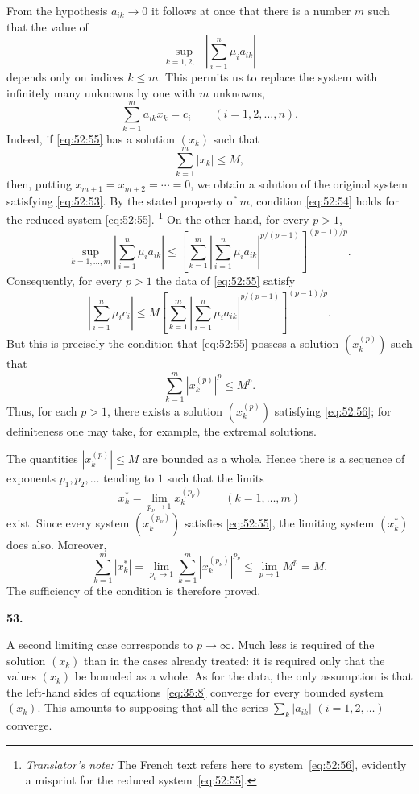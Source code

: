\documentclass[
  paper=b5,
  fontsize=13pt,
  twoside=true,
  open=any,
  bookmarkpackage=false,
  chapterprefix=true,
  headings=normal
]{scrbook}
\theoremstyle{definition}
\newcommand{\numberedparagraph}[1]{%
  \par\medskip\phantomsection\label{sec:#1}%
  \noindent\textbf{#1.}\enspace
}
\newcounter{translatornote}
\newcommand{\translatornotelabel}{T\arabic{translatornote}}
\newcommand{\translatornote}[1]{%
  \stepcounter{translatornote}%
  \begingroup
    \edef\savedfootnotenumber{\number\value{footnote}}%
    \renewcommand{\thefootnote}{\translatornotelabel}%
    \footnote{\emph{Translator's note:} #1}%
    \setcounter{footnote}{\savedfootnotenumber}%
  \endgroup
}
\begin{document}
From the hypothesis $a_{ik}\to0$ it follows at once that there is a number
$m$ such that the value of
\[
  \operatorname*{sup}_{k=1,2,\ldots}
    \left|\sum_{i=1}^{n}\mu_i a_{ik}\right|
\]
depends only on indices $k\leq m$. This permits us to replace the system
with infinitely many unknowns by one with $m$ unknowns,
\begin{equation}
  \sum_{k=1}^{m}a_{ik}x_k=c_i\qquad(i=1,2,\ldots,n).
  \tag{55}\label{eq:52:55}
\end{equation}
Indeed, if \eqref{eq:52:55} has a solution $(x_k)$ such that
\[
  \sum_{k=1}^{m}|x_k|\leq M,
\]
then, putting $x_{m+1}=x_{m+2}=\cdots=0$, we obtain a solution of the
original system satisfying \eqref{eq:52:53}. By the stated property of
$m$, condition \eqref{eq:52:54} holds for the reduced system
\eqref{eq:52:55}.\translatornote{The French text refers here to
system~\eqref{eq:52:56}, evidently a misprint for the reduced
system~\eqref{eq:52:55}.} On the other hand, for every $p>1$,
\[
 \operatorname*{sup}_{k=1,\ldots,m}
 \left|\sum_{i=1}^{n}\mu_i a_{ik}\right|
 \leq
 \left[
   \sum_{k=1}^{m}
   \left|\sum_{i=1}^{n}\mu_i a_{ik}\right|^{p/(p-1)}
 \right]^{(p-1)/p}.
\]
Consequently, for every $p>1$ the data of \eqref{eq:52:55} satisfy
\[
 \left|\sum_{i=1}^{n}\mu_i c_i\right|
 \leq M\left[
   \sum_{k=1}^{m}
   \left|\sum_{i=1}^{n}\mu_i a_{ik}\right|^{p/(p-1)}
 \right]^{(p-1)/p}.
\]
But this is precisely the condition that \eqref{eq:52:55} possess a
solution $(x_k^{(p)})$ such that
\begin{equation}
  \sum_{k=1}^{m}|x_k^{(p)}|^p\leq M^p.
  \tag{56}\label{eq:52:56}
\end{equation}
Thus, for each $p>1$, there exists a solution
$(x_k^{(p)})$ satisfying \eqref{eq:52:56}; for definiteness one may take,
for example, the extremal solutions.

The quantities $|x_k^{(p)}|\leq M$ are bounded as a whole. Hence there is a
sequence of exponents $p_1,p_2,\ldots$ tending to $1$ such that the limits
\[
  x_k^*=\lim_{p_\nu\to1}x_k^{(p_\nu)}\qquad(k=1,\ldots,m)
\]
exist. Since every system $(x_k^{(p_\nu)})$ satisfies
\eqref{eq:52:55}, the limiting system $(x_k^*)$ does also. Moreover,
\[
  \sum_{k=1}^{m}|x_k^*|
  =\lim_{p_\nu\to1}\sum_{k=1}^{m}|x_k^{(p_\nu)}|^{p_\nu}
  \leq\lim_{p\to1}M^p=M.
\]
The sufficiency of the condition is therefore proved.

\numberedparagraph{53}
A second limiting case corresponds to $p\to\infty$. Much less is required
of the solution $(x_k)$ than in the cases already treated: it is required
only that the values $(x_k)$ be bounded as a whole. As for the data, the
only assumption is that the left-hand sides of equations~\eqref{eq:35:8} converge for
every bounded system $(x_k)$. This amounts to supposing that all the series
$\sum_k|a_{ik}|$ $(i=1,2,\ldots)$ converge.
\end{document}
